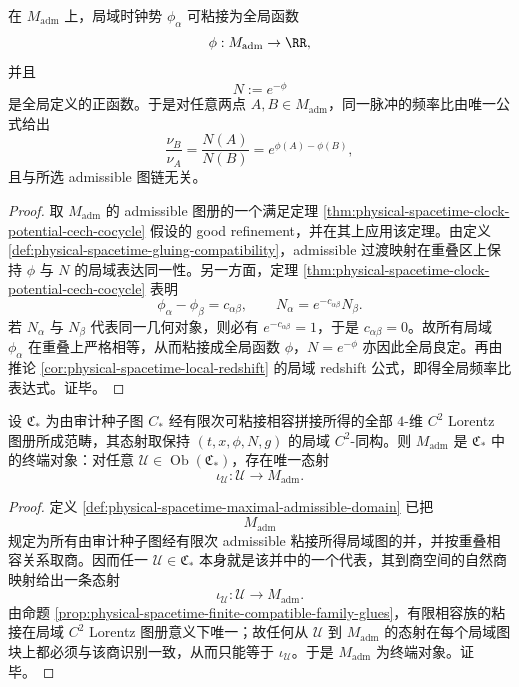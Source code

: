 \begin{corollary}\label{cor:physical-spacetime-global-clock-potential}
在 \(M_{\mathrm{adm}}\) 上，局域时钟势 \(\phi_\alpha\) 可粘接为全局函数
\[
\phi:M_{\mathrm{adm}}\to\RR,
\]
并且
\[
N:=e^{-\phi}
\]
是全局定义的正函数。于是对任意两点 \(A,B\in M_{\mathrm{adm}}\)，同一脉冲的频率比由唯一公式给出
\[
\frac{\nu_B}{\nu_A}=\frac{N(A)}{N(B)}=e^{\phi(A)-\phi(B)},
\]
且与所选 admissible 图链无关。
\end{corollary}
\begin{proof}
取 \(M_{\mathrm{adm}}\) 的 admissible 图册的一个满足定理 \ref{thm:physical-spacetime-clock-potential-cech-cocycle} 假设的 good refinement，并在其上应用该定理。由定义 \ref{def:physical-spacetime-gluing-compatibility}，admissible 过渡映射在重叠区上保持 \(\phi\) 与 \(N\) 的局域表达同一性。另一方面，定理 \ref{thm:physical-spacetime-clock-potential-cech-cocycle} 表明
\[
\phi_\alpha-\phi_\beta=c_{\alpha\beta},
\qquad
N_\alpha=e^{-c_{\alpha\beta}}N_\beta.
\]
若 \(N_\alpha\) 与 \(N_\beta\) 代表同一几何对象，则必有 \(e^{-c_{\alpha\beta}}=1\)，于是 \(c_{\alpha\beta}=0\)。故所有局域 \(\phi_\alpha\) 在重叠上严格相等，从而粘接成全局函数 \(\phi\)，\(N=e^{-\phi}\) 亦因此全局良定。再由推论 \ref{cor:physical-spacetime-local-redshift} 的局域 redshift 公式，即得全局频率比表达式。证毕。
\end{proof}

\begin{theorem}\label{thm:physical-spacetime-terminal-admissible-domain}
设 \(\mathfrak C_\ast\) 为由审计种子图 \(C_\ast\) 经有限次可粘接相容拼接所得的全部 \(4\)-维 \(C^2\) Lorentz 图册所成范畴，其态射取保持 \((t,x,\phi,N,g)\) 的局域 \(C^2\)-同构。则 \(M_{\mathrm{adm}}\) 是 \(\mathfrak C_\ast\) 中的终端对象：对任意 \(\mathcal U\in\operatorname{Ob}(\mathfrak C_\ast)\)，存在唯一态射
\[
\iota_{\mathcal U}:\mathcal U\longrightarrow M_{\mathrm{adm}}.
\]
\end{theorem}
\begin{proof}
定义 \ref{def:physical-spacetime-maximal-admissible-domain} 已把
\[
M_{\mathrm{adm}}
\]
规定为所有由审计种子图经有限次 admissible 粘接所得局域图的并，并按重叠相容关系取商。因而任一 \(\mathcal U\in\mathfrak C_\ast\) 本身就是该并中的一个代表，其到商空间的自然商映射给出一条态射
\[
\iota_{\mathcal U}:\mathcal U\to M_{\mathrm{adm}}.
\]
由命题 \ref{prop:physical-spacetime-finite-compatible-family-glues}，有限相容族的粘接在局域 \(C^2\) Lorentz 图册意义下唯一；故任何从 \(\mathcal U\) 到 \(M_{\mathrm{adm}}\) 的态射在每个局域图块上都必须与该商识别一致，从而只能等于 \(\iota_{\mathcal U}\)。于是 \(M_{\mathrm{adm}}\) 为终端对象。证毕。
\end{proof}

